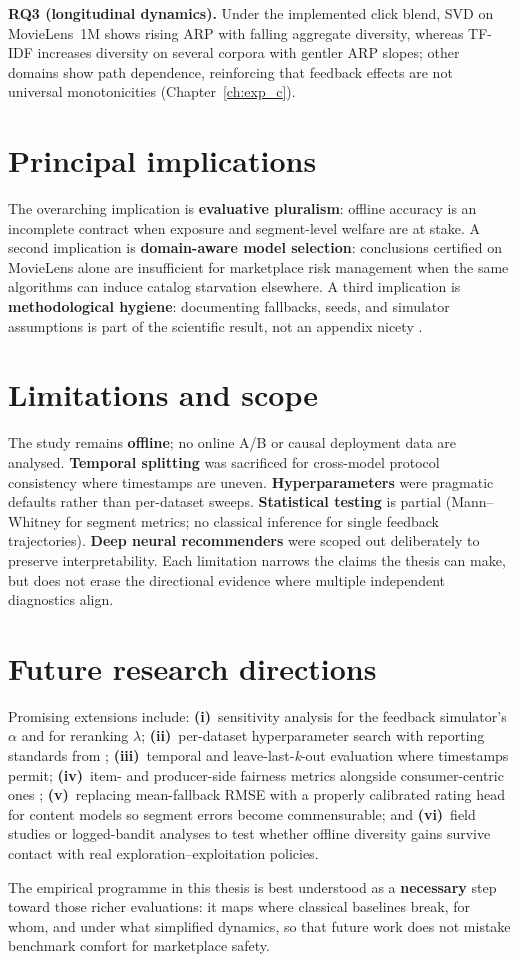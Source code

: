 \textbf{RQ3 (longitudinal dynamics).} Under the implemented click blend, SVD on MovieLens~1M shows rising ARP with falling aggregate diversity, whereas TF-IDF increases diversity on several corpora with gentler ARP slopes; other domains show path dependence, reinforcing that feedback effects are not universal monotonicities (Chapter~\ref{ch:exp_c}).

\section{Principal implications}
The overarching implication is \textbf{evaluative pluralism}: offline accuracy is an incomplete contract when exposure and segment-level welfare are at stake. A second implication is \textbf{domain-aware model selection}: conclusions certified on MovieLens alone are insufficient for marketplace risk management when the same algorithms can induce catalog starvation elsewhere. A third implication is \textbf{methodological hygiene}: documenting fallbacks, seeds, and simulator assumptions is part of the scientific result, not an appendix nicety \citep{ferrari2019progress}.

\section{Limitations and scope}
The study remains \textbf{offline}; no online A/B or causal deployment data are analysed. \textbf{Temporal splitting} was sacrificed for cross-model protocol consistency where timestamps are uneven. \textbf{Hyperparameters} were pragmatic defaults rather than per-dataset sweeps. \textbf{Statistical testing} is partial (Mann--Whitney for segment metrics; no classical inference for single feedback trajectories). \textbf{Deep neural recommenders} were scoped out deliberately to preserve interpretability. Each limitation narrows the claims the thesis can make, but does not erase the directional evidence where multiple independent diagnostics align.

\section{Future research directions}
Promising extensions include: \textbf{(i)}~sensitivity analysis for the feedback simulator's $\alpha$ and for reranking $\lambda$; \textbf{(ii)}~per-dataset hyperparameter search with reporting standards from \citet{ferrari2019progress}; \textbf{(iii)}~temporal and leave-last-\textit{k}-out evaluation where timestamps permit; \textbf{(iv)}~item- and producer-side fairness metrics alongside consumer-centric ones \citep{burke2017multisided}; \textbf{(v)}~replacing mean-fallback RMSE with a properly calibrated rating head for content models so segment errors become commensurable; and \textbf{(vi)}~field studies or logged-bandit analyses to test whether offline diversity gains survive contact with real exploration--exploitation policies.

The empirical programme in this thesis is best understood as a \textbf{necessary} step toward those richer evaluations: it maps where classical baselines break, for whom, and under what simplified dynamics, so that future work does not mistake benchmark comfort for marketplace safety.
